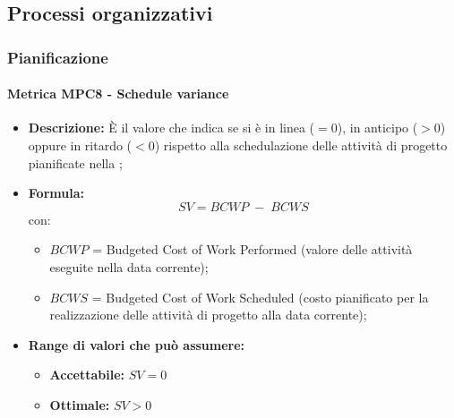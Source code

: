 \subsection{Processi organizzativi}

\subsubsection{Pianificazione}
    \paragraph{Metrica MPC8 - Schedule variance}
    \begin{itemize}
        \item \textbf{Descrizione:} È il valore che indica se si è in linea ($=0$), in anticipo ($>0$) oppure in ritardo ($<0$) rispetto alla schedulazione delle attività di progetto pianificate nella ;
        \item \textbf{Formula:} $$SV = {BCWP \; - \; BCWS}$$
        con:
        \begin{itemize}
            \item $BCWP$ = Budgeted Cost of Work Performed (valore delle attività eseguite nella data corrente);
            \item $BCWS$ = Budgeted Cost of Work Scheduled (costo pianificato per la realizzazione delle attività di progetto alla data corrente);
        \end{itemize}
        \item \textbf{Range di valori che può assumere:}
        \begin{itemize}
            \item \textbf{Accettabile:} $SV = 0$
            \item \textbf{Ottimale:} $SV > 0$
        \end{itemize}
    \end{itemize}


